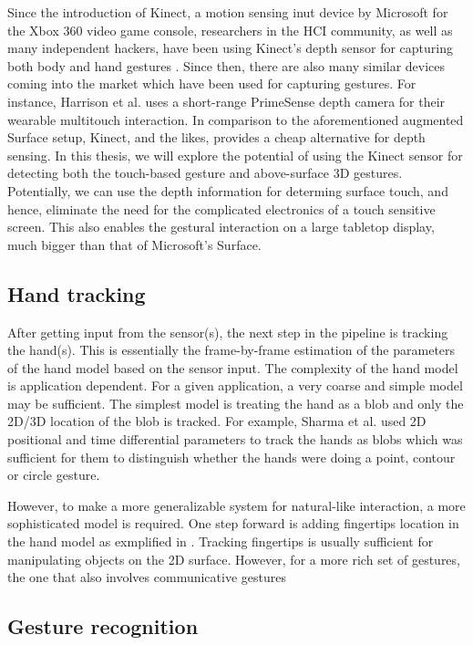 Since the introduction of Kinect, a motion sensing inut device by Microsoft for
the Xbox 360 video game console, researchers in the HCI community, as well as
many independent hackers, have been using Kinect's depth sensor for capturing
both body and hand gestures \cite{openni}. Since then, there are also many
similar devices coming into the market which have been used for capturing
gestures. For instance, Harrison et al. \cite{harrison11} uses  a short-range
PrimeSense \cite{primesense} depth camera for their wearable multitouch
interaction. In comparison to the aforementioned augmented Surface setup,
Kinect, and the likes, provides a cheap alternative for depth sensing. In this
thesis, we will explore the potential of using the Kinect sensor for detecting 
both the touch-based gesture and above-surface 3D gestures. Potentially, we can 
use the depth information for determing surface touch, and hence, eliminate the 
need for the complicated electronics of a touch sensitive screen. This also 
enables the gestural interaction on a large tabletop display, much bigger than 
that of Microsoft's Surface.

\subsection{Hand tracking}
After getting input from the sensor(s), the next step in the pipeline is
tracking the hand(s). This is essentially the frame-by-frame estimation of the
parameters of the hand model based on the sensor input. The complexity of the
hand model is application dependent. For a given application, a very coarse and
simple model may be sufficient. The simplest model is treating the hand as a
blob and only the 2D/3D location of the blob is tracked. For example, Sharma et
al. \cite{sharma00} used 2D positional and time differential parameters to track
the hands as blobs which was sufficient for them to distinguish whether the
hands were doing a point, contour or circle gesture.

However, to make a more generalizable system for natural-like interaction, a
more sophisticated model is required. One step forward is adding fingertips
location in the hand model as exmplified in \cite{Oka02} \cite{harrison11}
\cite{larson11}. Tracking fingertips is usually sufficient for manipulating
objects on the 2D surface. However, for a more rich set of gestures, the one
that also involves communicative gestures 

\subsection{Gesture recognition}

